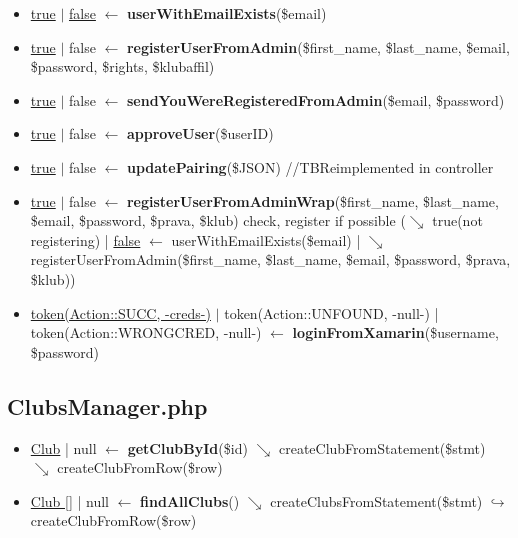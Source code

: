 \begin{itemize}
  \item \underline{true} $\vert$ \underline{false} $\leftarrow$ \textbf{userWithEmailExists}(\$email)
  \item \underline{true} $\vert$ false $\leftarrow$ \textbf{registerUserFromAdmin}(\$first\_name, \$last\_name, \$email, \$password, \$rights, \$klubaffil)
  \item \underline{true} $\vert$ false $\leftarrow$ \textbf{sendYouWereRegisteredFromAdmin}(\$email, \$password)
  \item \underline{true} $\vert$ false $\leftarrow$ \textbf{approveUser}(\$userID)
  \item \underline{true} $\vert$ false $\leftarrow$ \textbf{updatePairing}(\$JSON) //TBReimplemented in controller
  \item \underline{true} $\vert$ false $\leftarrow$ \textbf{registerUserFromAdminWrap}(\$first\_name, \$last\_name, \$email, \$password, \$prava, \$klub) check, register if possible ($\searrow$ true(not registering) | \underline{false} $\leftarrow$ userWithEmailExists(\$email) | $\searrow$ registerUserFromAdmin(\$first\_name, \$last\_name, \$email, \$password, \$prava, \$klub))
  \item \underline{token(Action::SUCC, -creds-)} $\vert$ token(Action::UNFOUND, -null-) | token(Action::WRONGCRED, -null-) $\leftarrow$ \textbf{loginFromXamarin}(\$username, \$password)
\end{itemize}
\subsection{ClubsManager.php}
\begin{itemize}
  \setlength\itemsep{0em}
  \item \underline{Club} | null $\leftarrow$ \textbf{getClubById}(\$id) $\searrow$ createClubFromStatement(\$stmt) $\searrow$ createClubFromRow(\$row)
  \item \underline{Club []} | null $\leftarrow$ \textbf{findAllClubs}() $\searrow$ createClubsFromStatement(\$stmt) $\hookrightarrow$ createClubFromRow(\$row)
\end{itemize}
